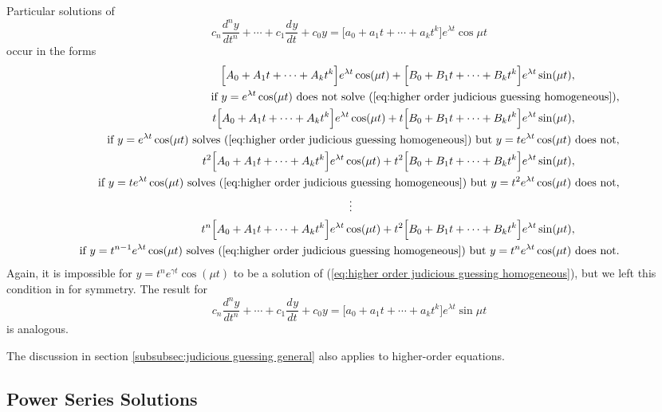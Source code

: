 \documentclass{myart}
\newcommand{\eq}[1]{(\ref{eq:#1})}
\newcommand{\deriv}[3][]{\frac{d^{#1}#2}{d#3^{#1}}}
\begin{document}
Particular solutions of
\begin{equation*}
c_n \deriv[n]{y}{t} + \cdots + c_1 \deriv{y}{t} + c_0 y = \Big[a_0 + a_1 t + \cdots + a_k t^k\Big]e^{\lambda t} \cos{\mu t}
\end{equation*}
occur in the forms
\begin{align*}
\Big[A_0 + A_1t + \cdots + A_k t^k\Big] e^{\lambda t} \cos(\mu t) + \Big[B_0 + B_1t + \cdots + B_k t^k\Big] e^{\lambda t} \sin(\mu t), \qquad \qquad \\
\text{if $y = e^{\lambda t} \cos(\mu t)$ does not solve \eq{higher order judicious guessing homogeneous}}, \\
t\Big[A_0 + A_1t + \cdots + A_k t^k\Big] e^{\lambda t} \cos(\mu t) + t\Big[B_0 + B_1t + \cdots + B_k t^k\Big] e^{\lambda t} \sin(\mu t), \qquad \qquad \\
\text{if $y = e^{\lambda t} \cos(\mu t)$ solves \eq{higher order judicious guessing homogeneous} but $y = te^{\lambda t} \cos(\mu t)$ does not}, \\
t^2\Big[A_0 + A_1t + \cdots + A_k t^k\Big] e^{\lambda t} \cos(\mu t) + t^2\Big[B_0 + B_1t + \cdots + B_k t^k\Big] e^{\lambda t} \sin(\mu t), \qquad \qquad \\
\text{if $y = te^{\lambda t} \cos(\mu t)$ solves \eq{higher order judicious guessing homogeneous} but $y = t^2e^{\lambda t} \cos(\mu t)$ does not}, \\
\vdots \hspace{239.5pt} \\
t^n\Big[A_0 + A_1t + \cdots + A_k t^k\Big] e^{\lambda t} \cos(\mu t) + t^2\Big[B_0 + B_1t + \cdots + B_k t^k\Big] e^{\lambda t} \sin(\mu t), \qquad \qquad \\
\text{if $y = t^{n-1}e^{\lambda t} \cos(\mu t)$ solves \eq{higher order judicious guessing homogeneous} but $y = t^n e^{\lambda t} \cos(\mu t)$ does not}.
\end{align*}
Again, it is impossible for $y = t^n e^{\gamma t} \cos(\mu t)$ to be a solution of \eq{higher order judicious guessing homogeneous}, but we left this condition in for symmetry. The result for
\begin{equation*}
c_n \deriv[n]{y}{t} + \cdots + c_1 \deriv{y}{t} + c_0 y = \Big[a_0 + a_1 t + \cdots + a_k t^k\Big]e^{\lambda t} \sin{\mu t}
\end{equation*}
is analogous.

The discussion in section \ref{subsubsec:judicious guessing general} also applies to higher-order equations.

\subsection{Power Series Solutions} \label{subsec:higher order power series}
\end{document}
